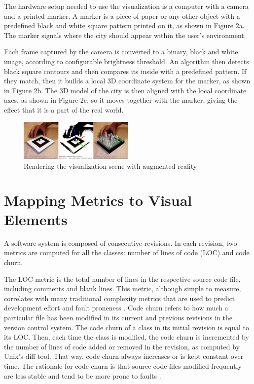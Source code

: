 The hardware setup needed to use the visualization is a computer with a camera and a printed marker. A marker is a piece of paper or any other object with a predefined black and white square pattern printed on it, as shown in Figure 2a. The marker signals where the city should appear within the user’s environment. 

Each frame captured by the camera is converted to a binary, black and white image, according to configurable brightness threshold. An algorithm then detects black square contours and then compares its inside with a predefined pattern. If they match, then it builds a local 3D coordinate system for the marker, as shown in Figure 2b. The 3D model of the city is then aligned with the local coordinate axes, as shown in Figure 2c, so it moves together with the marker, giving the effect that it is a part of the real world.

\begin{figure}[ht!]
 \centering
 \includegraphics[width=0.5\textwidth, bb=14 14 1343 490]{./images/visualizationRedering.eps}
 \caption{Rendering the visualization scene with augmented reality}
 \label{fig:rendering_visualization}
\end{figure}

\section{Mapping Metrics to Visual Elements} \label{sec:metrics_visual_elements}
A software system is composed of consecutive revisions. In each revision, two metrics are computed for all the classes: number of lines of code (LOC) and code churn. 

The LOC metric is the total number of lines in the respective source code file, including comments and blank lines. This metric, although simple to measure, correlates with many traditional complexity metrics that are used to predict development effort and fault proneness \cite{eleman:2001}.
Code churn refers to how much a particular file has been modified in its current and previous revisions in the version control system. The code churn of a class in its initial revision is equal to its LOC. Then, each time the class is modified, the code churn is incremented by the number of lines of code added or removed in the revision, as computed by Unix’s diff tool. That way, code churn always increases or is kept constant over time. The rationale for code churn is that source code files modified frequently are less stable and tend to be more prone to faults \cite{nagappan:2005}.


